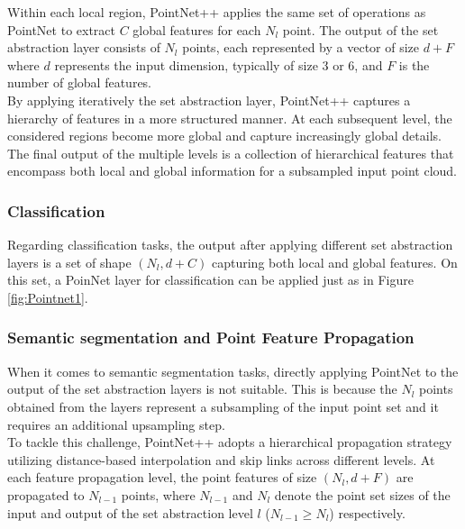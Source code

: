Within each local region, PointNet++ applies the same set of operations as PointNet to extract $C$ global features for each $N_l$ point. The output of the set abstraction layer consists of $N_l$ points, each represented by a vector of size $d+F$ where $d$ represents the input dimension, typically of size 3 or 6, and $F$ is the number of global features.\\

By applying iteratively the set abstraction layer, PointNet++ captures a hierarchy of features in a more structured manner. At each subsequent level, the considered regions become more global and capture increasingly global details. The final output of the multiple levels is a collection of hierarchical features that encompass both local and global information for a subsampled input point cloud.\\

\subsubsection{Classification}
Regarding classification tasks, the output after applying different set abstraction layers is a set of shape $(N_l,d+C)$ capturing both local and global features. On this set, a PoinNet layer for classification can be applied just as in Figure \ref{fig:Pointnet1}.

\subsubsection{Semantic segmentation and Point Feature Propagation}
When it comes to semantic segmentation tasks, directly applying PointNet to the output of the set abstraction layers is not suitable. This is because the $N_l$ points obtained from the layers represent a subsampling of the input point set and it requires an additional upsampling step.\\

To tackle this challenge, PointNet++ adopts a hierarchical propagation strategy utilizing distance-based interpolation and skip links across different levels. At each feature propagation level, the point features of size $(N_{l},d + F) $ are propagated to $N_{l-1}$ points, where $N_{l-1}$ and $N_{l}$ denote the point set sizes of the input and output of the set abstraction level $l$ ($N_{l-1} \geq N_l$) respectively.\\

